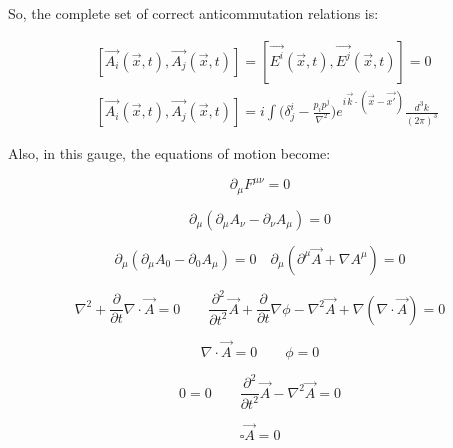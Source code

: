\documentclass[a4]{article}
\begin{document}
    So, the complete set of correct anticommutation relations is:

    \begin{framed}
        \begin{equation}
            \begin{aligned}
                \quad [\vec{A_{i}} (\vec{x}, t), \vec{A_{j}} (\vec{x}, t)] = [\vec{E^{i}} (\vec{x}, t), \vec{E^{j}} (\vec{x}, t)] = 0 \\
                \quad [\vec{A_{i}} (\vec{x}, t), \vec{A_{j}} (\vec{x}, t)] = i \int \bigg( \delta^{i}_{j} - \frac{p_{i} p^{j}}{\nabla^{2}} \bigg) e^{i \vec{k} \cdot (\vec{x} - \vec{x'})} \frac{d^{3} k}{(2 \pi)^3}
            \end{aligned}
        \end{equation}
    \end{framed}

    Also, in this gauge, the equations of motion become:

    \begin{equation}
        \partial_{\mu} F^{\mu \nu} = 0
    \end{equation}

    \begin{equation}
        \partial_{\mu} (\partial_{\mu} A_{\nu} - \partial_{\nu} A_{\mu}) = 0
    \end{equation}

    \begin{equation}
        \partial_{\mu} (\partial_{\mu} A_{0} - \partial_{0} A_{\mu}) = 0 \quad \partial_{\mu} (\partial^{\mu} \vec{A} + \nabla A^{\mu}) = 0
    \end{equation}

    \begin{equation}
        \nabla^{2} + \frac{\partial}{\partial t} \nabla \cdot \vec{A} = 0 \qquad \frac{\partial^2}{\partial t^2} \vec{A} + \frac{\partial}{\partial t} \nabla \phi - \nabla^{2} \vec{A} + \nabla (\nabla \cdot \vec{A}) = 0
    \end{equation}

    \begin{equation}
        \nabla \cdot \vec{A} = 0 \qquad \phi = 0
    \end{equation}

    \begin{equation}
        0 = 0 \qquad \frac{\partial^2}{\partial t^2} \vec{A} - \nabla^{2} \vec{A} = 0
    \end{equation}

    \begin{framed}
        \begin{equation}
            \square \vec{A} = 0
        \end{equation}
    \end{framed}
\end{document}
